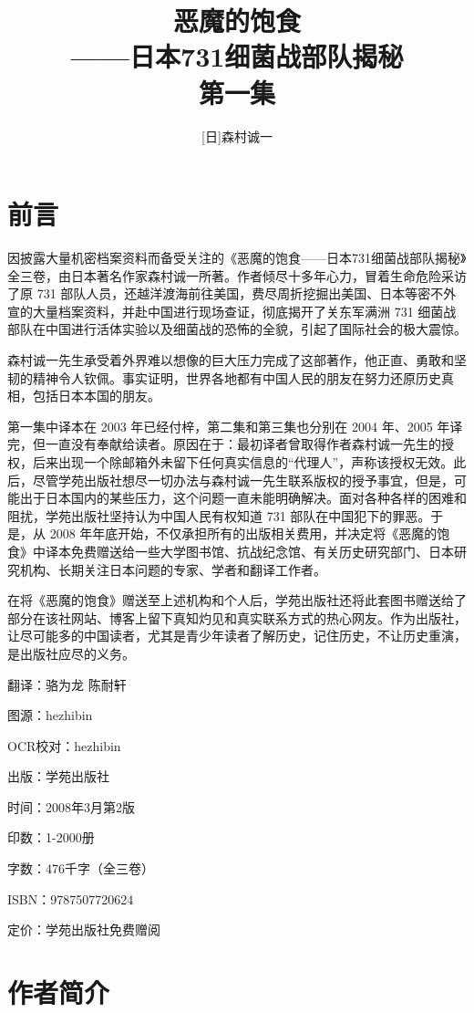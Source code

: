 \documentclass[a4paper,12pt,UTF8,twoside]{ctexbook}
\title{\heiti\zihao{0} 恶魔的饱食\\ \zihao{1}——日本731细菌战部队揭秘\\ 第一集}
\author{[日]森村诚一}
\date{}
\begin{document}
\maketitle
\tableofcontents

\frontmatter

\chapter{前言}

因披露大量机密档案资料而备受关注的《恶魔的饱食——日本731细菌战部队揭秘》全三卷，由日本著名作家森村诚一所著。作者倾尽十多年心力，冒着生命危险采访了原 731 部队人员，还越洋渡海前往美国，费尽周折挖掘出美国、日本等密不外宣的大量档案资料，并赴中国进行现场查证，彻底揭开了关东军满洲 731 细菌战部队在中国进行活体实验以及细菌战的恐怖的全貌，引起了国际社会的极大震惊。

森村诚一先生承受着外界难以想像的巨大压力完成了这部著作，他正直、勇敢和坚韧的精神令人钦佩。事实证明，世界各地都有中国人民的朋友在努力还原历史真相，包括日本本国的朋友。

第一集中译本在 2003 年已经付梓，第二集和第三集也分别在 2004 年、2005 年译完，但一直没有奉献给读者。原因在于：最初译者曾取得作者森村诚一先生的授权，后来出现一个除邮箱外未留下任何真实信息的“代理人”，声称该授权无效。此后，尽管学苑出版社想尽一切办法与森村诚一先生联系版权的授予事宜，但是，可能出于日本国内的某些压力，这个问题一直未能明确解决。面对各种各样的困难和阻扰，学苑出版社坚持认为中国人民有权知道 731 部队在中国犯下的罪恶。于是，从 2008 年年底开始，不仅承担所有的出版相关费用，并决定将《恶魔的饱食》中译本免费赠送给一些大学图书馆、抗战纪念馆、有关历史研究部门、日本研究机构、长期关注日本问题的专家、学者和翻译工作者。

在将《恶魔的饱食》赠送至上述机构和个人后，学苑出版社还将此套图书赠送给了部分在该社网站、博客上留下真知灼见和真实联系方式的热心网友。作为出版社，让尽可能多的中国读者，尤其是青少年读者了解历史，记住历史，不让历史重演，是出版社应尽的义务。

翻译：骆为龙 陈耐轩

图源：hezhibin

OCR校对：hezhibin

出版：学苑出版社

时间：2008年3月第2版

印数：1-2000册

字数：476千字（全三卷）

ISBN：9787507720624

定价：学苑出版社免费赠阅

\chapter{作者简介}
\end{document}
